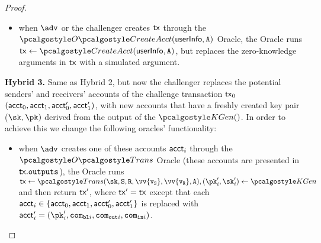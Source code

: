 \begin{proof}
\begin{itemize}
    \item when $\adv$ or the challenger creates $\textup{\textsf{tx}}$ through the $\createAcctOracle(\userinfo, \anset)$ Oracle, the Oracle runs $\txn \gets \createAcct(\userinfo, \anset)$, but replaces the zero-knowledge arguments in $\textup{\textsf{tx}}$ with a simulated argument.\\
\end{itemize}
% 
\textbf{Hybrid 3.} Same as Hybrid 2, but now the challenger replaces the potential senders' and receivers' accounts of the challenge transaction $\textup{\textsf{tx}}_0$ $(\textup{\textsf{acct}}_0, \textup{\textsf{acct}}_1, \textup{\textsf{acct}}_0^\prime, \textup{\textsf{acct}}_1^\prime)$, with new accounts that have a freshly created key pair ($\sk, \pk)$ derived from the output of the $\kgen()$. 
In order to achieve this we change the following oracles' functionality:
\begin{itemize} 
    \item when $\adv$ creates one of these accounts $\textup{\textsf{acct}}_i$ through the $\transOracle$ Oracle (these accounts are presented in $\textup{\textsf{tx}}.{\textup{\texttt{outputs}}}$), the Oracle runs $\txn \gets \trans(\sk,\sset, \rset, \vv{\v_\sset}, \vv{\v_\rset}, \anset), (\pk_i^\prime, \sk_i^\prime) \gets \kgen$ and then return $\textup{\textsf{tx}}^\prime$, where $\textup{\textsf{tx}}^\prime = \textup{\textsf{tx}}$ except that each $\textup{\textsf{acct}}_i \in \{\textup{\textsf{acct}}_0, \textup{\textsf{acct}}_1, \textup{\textsf{acct}}_0^\prime, \textup{\textsf{acct}}_1^\prime\}$ is replaced with $\acct_i^\prime = (\pk_i^\prime, \com_{\varbl i}, \com_{\varout i}, \com_{\varin i})$.\\
    

\end{itemize}
\end{proof}
